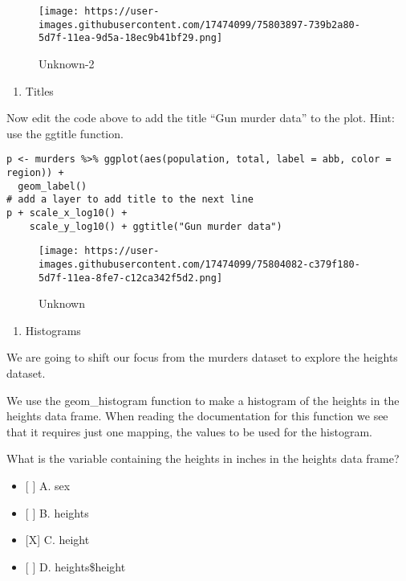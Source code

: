 \documentclass[]{article}
\providecommand{\tightlist}{%
  \setlength{\itemsep}{0pt}\setlength{\parskip}{0pt}}
\begin{document}
\begin{figure}
\centering
\texttt{[image: https://user-images.githubusercontent.com/17474099/75803897-739b2a80-5d7f-11ea-9d5a-18ec9b41bf29.png]}
\caption{Unknown-2}
\end{figure}

\begin{enumerate}
\def\labelenumi{\arabic{enumi}.}
\setcounter{enumi}{13}
\tightlist
\item
  Titles
\end{enumerate}

Now edit the code above to add the title ``Gun murder data'' to the
plot. Hint: use the ggtitle function.

\begin{verbatim}
p <- murders %>% ggplot(aes(population, total, label = abb, color = region)) +
  geom_label()
# add a layer to add title to the next line
p + scale_x_log10() + 
    scale_y_log10() + ggtitle("Gun murder data")
\end{verbatim}

\begin{figure}
\centering
\texttt{[image: https://user-images.githubusercontent.com/17474099/75804082-c379f180-5d7f-11ea-8fe7-c12ca342f5d2.png]}
\caption{Unknown}
\end{figure}

\begin{enumerate}
\def\labelenumi{\arabic{enumi}.}
\setcounter{enumi}{14}
\tightlist
\item
  Histograms
\end{enumerate}

We are going to shift our focus from the murders dataset to explore the
heights dataset.

We use the geom\_histogram function to make a histogram of the heights
in the heights data frame. When reading the documentation for this
function we see that it requires just one mapping, the values to be used
for the histogram.

What is the variable containing the heights in inches in the heights
data frame?

\begin{itemize}
\tightlist
\item
  {[} {]} A. sex
\item
  {[} {]} B. heights
\item
  {[}X{]} C. height
\item
  {[} {]} D. heights\$height
\end{itemize}
\end{document}
